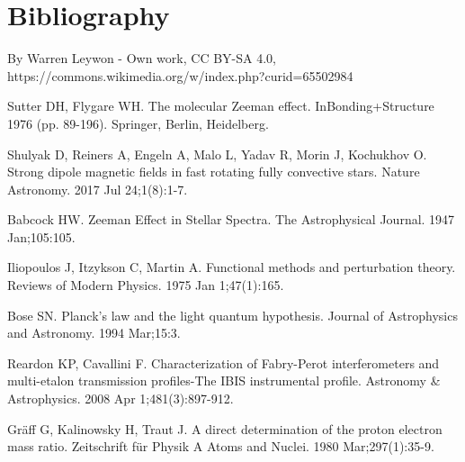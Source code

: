 \documentclass[a4paper,11pt]{article}
\begin{document}
\section{Bibliography}
\begin{thebibliography}{}
     By Warren Leywon - Own work, CC BY-SA 4.0, https://commons.wikimedia.org/w/index.php?curid=65502984
    
    Sutter DH, Flygare WH. The molecular Zeeman effect. InBonding+Structure 1976 (pp. 89-196). Springer, Berlin, Heidelberg.
    
    Shulyak D, Reiners A, Engeln A, Malo L, Yadav R, Morin J, Kochukhov O. Strong dipole magnetic fields in fast rotating fully convective stars. Nature Astronomy. 2017 Jul 24;1(8):1-7.
    
    Babcock HW. Zeeman Effect in Stellar Spectra. The Astrophysical Journal. 1947 Jan;105:105.
    
    Iliopoulos J, Itzykson C, Martin A. Functional methods and perturbation theory. Reviews of Modern Physics. 1975 Jan 1;47(1):165.
    
    Bose SN. Planck's law and the light quantum hypothesis. Journal of Astrophysics and Astronomy. 1994 Mar;15:3.
    
    Reardon KP, Cavallini F. Characterization of Fabry-Perot interferometers and multi-etalon transmission profiles-The IBIS instrumental profile. Astronomy & Astrophysics. 2008 Apr 1;481(3):897-912.

    Gräff G, Kalinowsky H, Traut J. A direct determination of the proton electron mass ratio. Zeitschrift für Physik A Atoms and Nuclei. 1980 Mar;297(1):35-9.
\end{thebibliography}
\end{document}

